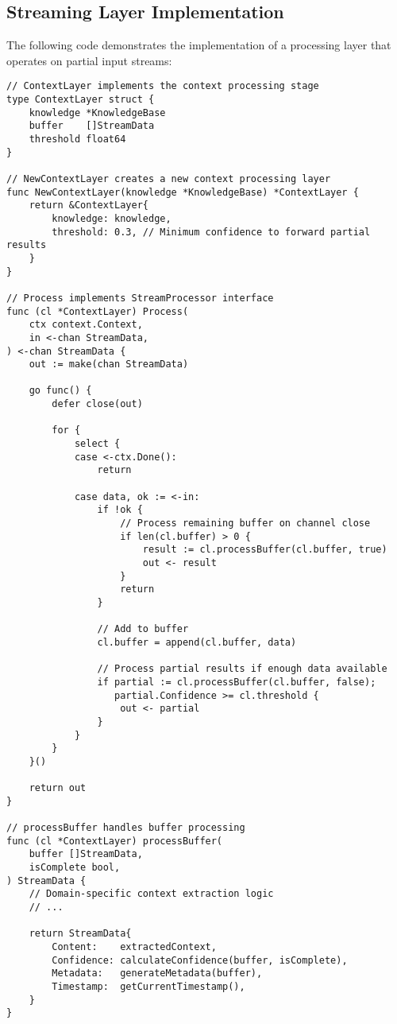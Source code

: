 \documentclass[11pt,a4paper,twocolumn]{article}
\begin{document}
\subsection{Streaming Layer Implementation}
The following code demonstrates the implementation of a processing layer that operates on partial input streams:

\begin{lstlisting}[caption={Streaming Layer Implementation}, label={lst:streaming}]
// ContextLayer implements the context processing stage
type ContextLayer struct {
    knowledge *KnowledgeBase
    buffer    []StreamData
    threshold float64
}

// NewContextLayer creates a new context processing layer
func NewContextLayer(knowledge *KnowledgeBase) *ContextLayer {
    return &ContextLayer{
        knowledge: knowledge,
        threshold: 0.3, // Minimum confidence to forward partial results
    }
}

// Process implements StreamProcessor interface
func (cl *ContextLayer) Process(
    ctx context.Context, 
    in <-chan StreamData,
) <-chan StreamData {
    out := make(chan StreamData)
    
    go func() {
        defer close(out)
        
        for {
            select {
            case <-ctx.Done():
                return
                
            case data, ok := <-in:
                if !ok {
                    // Process remaining buffer on channel close
                    if len(cl.buffer) > 0 {
                        result := cl.processBuffer(cl.buffer, true)
                        out <- result
                    }
                    return
                }
                
                // Add to buffer
                cl.buffer = append(cl.buffer, data)
                
                // Process partial results if enough data available
                if partial := cl.processBuffer(cl.buffer, false); 
                   partial.Confidence >= cl.threshold {
                    out <- partial
                }
            }
        }
    }()
    
    return out
}

// processBuffer handles buffer processing
func (cl *ContextLayer) processBuffer(
    buffer []StreamData, 
    isComplete bool,
) StreamData {
    // Domain-specific context extraction logic
    // ...
    
    return StreamData{
        Content:    extractedContext,
        Confidence: calculateConfidence(buffer, isComplete),
        Metadata:   generateMetadata(buffer),
        Timestamp:  getCurrentTimestamp(),
    }
}
\end{lstlisting}
\end{document}
